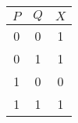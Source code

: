 \begin{center}
    
\begin{tabular}{|cc|c|}
\hline
  $P$ & $Q$ & $X$ \\ \hline
  0 & 0 & 1 \\ 
  0 & 1 & 1 \\ 
  1 & 0 & 0 \\ 
  1 & 1 & 1 \\ \hline
\end{tabular}
\end{center}
